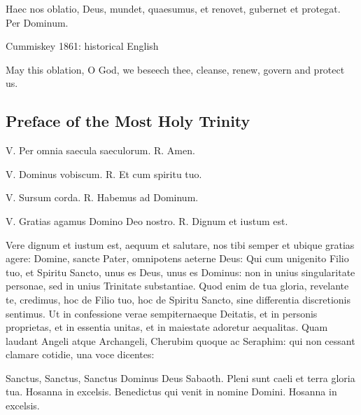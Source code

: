 \label{proper-secret}


\begin{latinproper}

Haec nos oblatio, Deus, mundet, quaesumus, et renovet, gubernet et protegat. Per Dominum.

\end{latinproper}

\begin{englishwitness}{Cummiskey 1861: historical English}

May this oblation, O God, we beseech thee, cleanse, renew, govern and protect us.

\end{englishwitness}


\subsection{Preface of the Most Holy Trinity}

\label{proper-preface}


\begin{latinproper}

V. Per omnia saecula saeculorum. R. Amen.

V. Dominus vobiscum. R. Et cum spiritu tuo.

V. Sursum corda. R. Habemus ad Dominum.

V. Gratias agamus Domino Deo nostro. R. Dignum et iustum est.

Vere dignum et iustum est, aequum et salutare, nos tibi semper et ubique gratias agere: Domine, sancte Pater, omnipotens aeterne Deus: Qui cum unigenito Filio tuo, et Spiritu Sancto, unus es Deus, unus es Dominus: non in unius singularitate personae, sed in unius Trinitate substantiae. Quod enim de tua gloria, revelante te, credimus, hoc de Filio tuo, hoc de Spiritu Sancto, sine differentia discretionis sentimus. Ut in confessione verae sempiternaeque Deitatis, et in personis proprietas, et in essentia unitas, et in maiestate adoretur aequalitas. Quam laudant Angeli atque Archangeli, Cherubim quoque ac Seraphim: qui non cessant clamare cotidie, una voce dicentes:

Sanctus, Sanctus, Sanctus Dominus Deus Sabaoth. Pleni sunt caeli et terra gloria tua. Hosanna in excelsis. Benedictus qui venit in nomine Domini. Hosanna in excelsis.

\end{latinproper}

